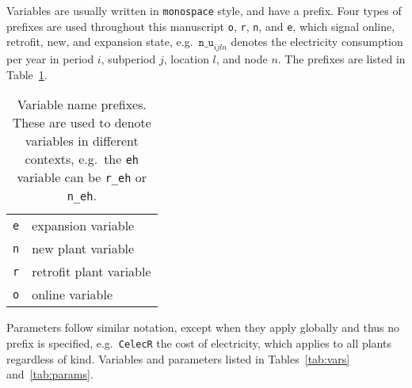 \documentclass{amsbook}
\begin{document}
Variables are usually written in \texttt{monospace} style, and have a prefix.
Four types of prefixes are used throughout this manuscript \texttt{o},
\texttt{r}, \texttt{n}, and \texttt{e}, which signal online, retrofit, new, and
expansion state, e.g.\ $\mathtt{n\_u}_{ijln}$ denotes the electricity consumption
per year in period $i$, subperiod $j$, location $l$, and node $n$. The prefixes
are listed in Table~\ref{tab:prefixes}. 
\begin{table}[h]
    \caption{Variable name prefixes. These are used to denote variables in
    different contexts, e.g.\ the \texttt{eh} variable can be \texttt{r\_eh} or
    \texttt{n\_eh}.
    }
    \begin{tabular}{@{}ll@{}}
        \texttt{e} & expansion variable \\
        \texttt{n} & new plant variable \\
        \texttt{r} & retrofit plant variable \\
        \texttt{o} & online variable \\
    \end{tabular}\label{tab:prefixes}
\end{table}
Parameters follow similar notation, except when they apply globally and thus no
prefix is specified, e.g.\ \texttt{CelecR} the cost of electricity, which
applies to all plants regardless of kind. Variables and parameters listed in
Tables~\ref{tab:vars} and~\ref{tab:params}. 
%
\end{document}
